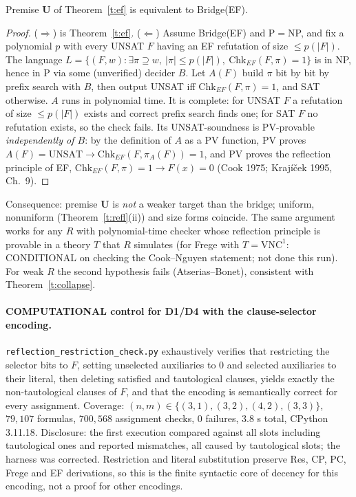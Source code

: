 \documentclass[11pt]{article}
\begin{document}
\begin{theorem}\label{t:U}
Premise $\mathbf U$ of Theorem~\ref{t:ef} is equivalent to Bridge(EF).
\end{theorem}
\begin{proof}
($\Rightarrow$) is Theorem~\ref{t:ef}. ($\Leftarrow$) Assume Bridge(EF) and P$=$NP, and fix a
polynomial $p$ with every UNSAT $F$ having an EF refutation of size $\le p(|F|)$. The
language $L=\{(F,w):\exists\pi\supseteq w,\ |\pi|\le p(|F|),\ \mathrm{Chk}_{EF}(F,\pi)=1\}$
is in NP, hence in P via some (unverified) decider $B$. Let $A(F)$ build $\pi$ bit by bit by
prefix search with $B$, then output UNSAT iff $\mathrm{Chk}_{EF}(F,\pi)=1$, and SAT
otherwise. $A$ runs in polynomial time. It is complete: for UNSAT $F$ a refutation of size
$\le p(|F|)$ exists and correct prefix search finds one; for SAT $F$ no refutation exists,
so the check fails. Its UNSAT-soundness is PV-provable \emph{independently of $B$}:
by the definition of $A$ as a PV function, PV proves $A(F)=\mathrm{UNSAT}\to
\mathrm{Chk}_{EF}(F,\pi_A(F))=1$, and PV proves the reflection principle of EF,
$\mathrm{Chk}_{EF}(F,\pi)=1\to F(x)=0$ (Cook 1975; Kraj\'i\v{c}ek 1995, Ch.~9).
\end{proof}
Consequence: premise $\mathbf U$ is \emph{not} a weaker target than the bridge; uniform,
nonuniform (Theorem~\ref{t:refl}(ii)) and size forms coincide. The same argument works for
any $R$ with polynomial-time checker whose reflection principle is provable in a theory
$T$ that $R$ simulates (for Frege with $T=\mathrm{VNC}^1$: CONDITIONAL on checking the
Cook--Nguyen statement; not done this run). For weak $R$ the second hypothesis fails
(Atserias--Bonet), consistent with Theorem~\ref{t:collapse}.

\paragraph{COMPUTATIONAL control for D1/D4 with the clause-selector encoding.}
\texttt{reflection\_restriction\_check.py} exhaustively verifies that restricting the
selector bits to $F$, setting unselected auxiliaries to $0$ and selected auxiliaries to their
literal, then deleting satisfied and tautological clauses, yields exactly the
non-tautological clauses of $F$, and that the encoding is semantically correct for every
assignment. Coverage: $(n,m)\in\{(3,1),(3,2),(4,2),(3,3)\}$, $79{,}107$ formulas,
$700{,}568$ assignment checks, 0 failures, 3.8 s total, CPython 3.11.18. Disclosure: the
first execution compared against all slots including tautological ones and reported
mismatches, all caused by tautological slots; the harness was corrected. Restriction and
literal substitution preserve Res, CP, PC, Frege and EF derivations, so this is the finite
syntactic core of decency for this encoding, not a proof for other encodings.
\end{document}
